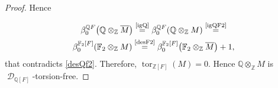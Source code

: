 \documentclass[10pt,a4paper]{amsart}
\DeclareMathOperator{\D}{\mathcal D}
\DeclareMathOperator{\tor}{tor}
\newcommand{\Q}{\mathbb{Q}}
\newcommand{\Z}{\mathbb{Z}}
\newcommand{\myeq}[1]{\ensuremath{\stackrel{\text{#1}}{=}}}
\begin{document}
\begin{proof}
Hence 

\begin{multline*}
\beta_0^{\mathbb{Q}F}\!\left(\mathbb{Q} \otimes_{\mathbb{Z}} \overline M\right) 
   \myeq{\cref{igQ}} \beta_0^{\mathbb{Q}F}\!\left(\mathbb{Q} \otimes_{\mathbb{Z}} M \right)
   \myeq{\cref{igQF2}}\\
   \beta_0^{\mathbb{F}_2[F]}\!\left(\mathbb{F}_2 \otimes_{\mathbb{Z}} M\right) 
   \myeq{\cref{desF2}} \beta_0^{\mathbb{F}_2[F]}\!\left(\mathbb{F}_2 \otimes_{\mathbb{Z}} \overline M\right) +1,
   \end{multline*}
 that contradicts \cref{desQf2}.
Therefore, $  \tor_{\Z[F]}(M)=0$.   Hence $ \Q\otimes_\Z M$ is  $\D_{\Q[F]}$-torsion-free.
 \renewcommand\qedsymbol{$\diamond$}\end{proof}
\end{document}
